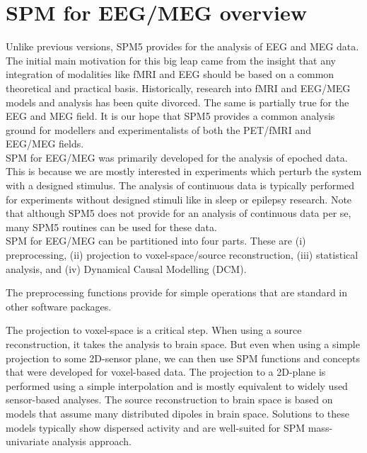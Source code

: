 \chapter{SPM for EEG/MEG overview}
\label{ch:eeg_overview}
Unlike previous versions, SPM5 provides for
the analysis of EEG and MEG data. The initial main motivation for this big
leap came from the insight that any integration of modalities like
fMRI and EEG should be based on a common theoretical and practical
basis. Historically, research into fMRI and EEG/MEG models and
analysis has been quite divorced. The same is partially true for the
EEG and MEG field. It is our hope that SPM5 provides a common analysis
ground for modellers and experimentalists of both the PET/fMRI and 
EEG/MEG fields.
\\

SPM for EEG/MEG was primarily developed for the analysis of epoched
data. This is because we are mostly interested in experiments which
perturb the system with a designed stimulus. The analysis of
continuous data is typically performed for experiments without
designed stimuli like in sleep or epilepsy research. Note that although
SPM5 does not provide for an analysis of continuous data per se, many
SPM5 routines can be used for these data.
\\

SPM for EEG/MEG can be partitioned into four parts. These are (i)
preprocessing, (ii) projection to voxel-space/source reconstruction,
(iii) statistical analysis, and (iv) Dynamical Causal Modelling (DCM). 

The preprocessing functions provide for simple operations that are
standard in other software packages. 

The projection to voxel-space is a critical step. When using a source
reconstruction, it takes the analysis to brain space. But even when
using a simple projection to some 2D-sensor plane, we can then use SPM
functions and concepts that were developed for voxel-based data. The
projection to a 2D-plane is performed using a simple interpolation and
is mostly equivalent to widely used sensor-based analyses. The source
reconstruction to brain space is based on models that assume many
distributed dipoles in brain space. Solutions to these models
typically show dispersed activity and are well-suited for SPM
mass-univariate analysis approach.
\\

